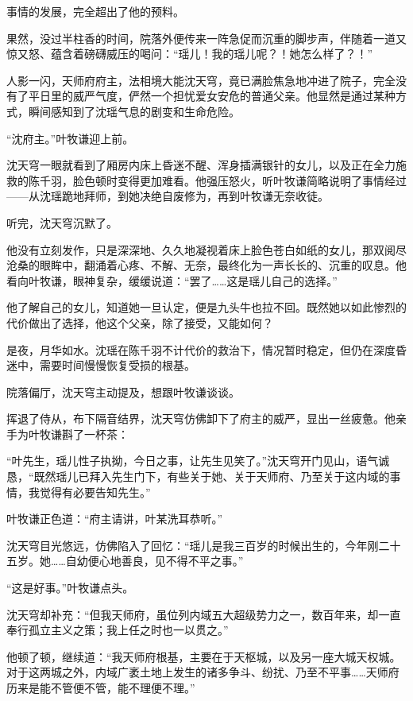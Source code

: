 事情的发展，完全超出了他的预料。

\vspace{2em}

果然，没过半柱香的时间，院落外便传来一阵急促而沉重的脚步声，伴随着一道又惊又怒、蕴含着磅礴威压的喝问：“瑶儿！我的瑶儿呢？！她怎么样了？！”

人影一闪，天师府府主，法相境大能沈天穹，竟已满脸焦急地冲进了院子，完全没有了平日里的威严气度，俨然一个担忧爱女安危的普通父亲。他显然是通过某种方式，瞬间感知到了沈瑶气息的剧变和生命危险。

“沈府主。”叶牧谦迎上前。

沈天穹一眼就看到了厢房内床上昏迷不醒、浑身插满银针的女儿，以及正在全力施救的陈千羽，脸色顿时变得更加难看。他强压怒火，听叶牧谦简略说明了事情经过——从沈瑶跪地拜师，到她决绝自废修为，再到叶牧谦无奈收徒。

听完，沈天穹沉默了。

他没有立刻发作，只是深深地、久久地凝视着床上脸色苍白如纸的女儿，那双阅尽沧桑的眼眸中，翻涌着心疼、不解、无奈，最终化为一声长长的、沉重的叹息。他看向叶牧谦，眼神复杂，缓缓说道：“罢了……这是瑶儿自己的选择。”

他了解自己的女儿，知道她一旦认定，便是九头牛也拉不回。既然她以如此惨烈的代价做出了选择，他这个父亲，除了接受，又能如何？

是夜，月华如水。沈瑶在陈千羽不计代价的救治下，情况暂时稳定，但仍在深度昏迷中，需要时间慢慢恢复受损的根基。

院落偏厅，沈天穹主动提及，想跟叶牧谦谈谈。

挥退了侍从，布下隔音结界，沈天穹仿佛卸下了府主的威严，显出一丝疲惫。他亲手为叶牧谦斟了一杯茶：

“叶先生，瑶儿性子执拗，今日之事，让先生见笑了。”沈天穹开门见山，语气诚恳，“既然瑶儿已拜入先生门下，有些关于她、关于天师府、乃至关于这内域的事情，我觉得有必要告知先生。”

叶牧谦正色道：“府主请讲，叶某洗耳恭听。”

沈天穹目光悠远，仿佛陷入了回忆：“瑶儿是我三百岁的时候出生的，今年刚二十五岁。她……自幼便心地善良，见不得不平之事。”

“这是好事。”叶牧谦点头。

沈天穹却补充：“但我天师府，虽位列内域五大超级势力之一，数百年来，却一直奉行孤立主义之策；我上任之时也一以贯之。”

他顿了顿，继续道：“我天师府根基，主要在于天枢城，以及另一座大城天权城。对于这两城之外，内域广袤土地上发生的诸多争斗、纷扰、乃至不平事……天师府历来是能不管便不管，能不理便不理。”

